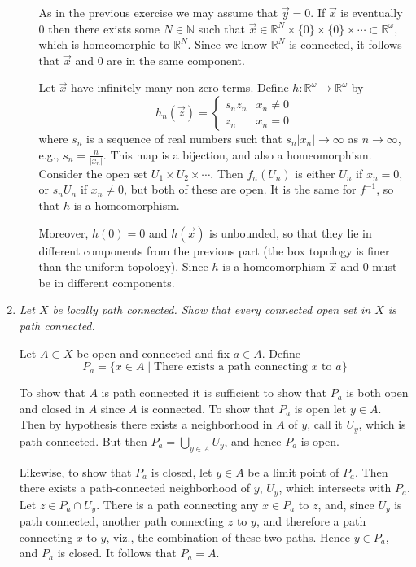 \documentclass[10pt]{article}
\newcommand{\N}{\mathbb{N}}
\newcommand{\R}{\mathbb{R}}
\begin{document}
\begin{enumerate}
\begin{enumerate}
As in the previous exercise we may assume that $\vec{y} = 0$.  If $\vec{x}$ is eventually $0$ then there exists some $N \in \N$ such that $\vec{x} \in \R^N \times \{0\} \times \{0\} \times \cdots \subset \R^\omega$, which is homeomorphic to $\R^N$.  Since we know $\R^N$ is connected, it follows that $\vec{x}$ and $0$ are in the same component.

Let $\vec{x}$ have infinitely many non-zero terms.  Define $h: \R^\omega \rightarrow \R^\omega$ by $$h_n(\vec{z}) = \begin{cases} s_n z_n & x_n \neq 0 \\ z_n & x_n = 0 \end{cases}$$ where $s_n$ is a sequence of real numbers such that $s_n|x_n| \rightarrow \infty$ as $n \rightarrow \infty$, e.g., $s_n = \frac{n}{|x_n|}$.  This map is a bijection, and also a homeomorphism.  Consider the open set $U_1 \times U_2 \times \cdots$.  Then $f_n(U_n)$ is either $U_n$ if $x_n = 0$, or $s_nU_n$ if $x_n \neq 0$, but both of these are open.  It is the same for $f^{-1}$, so that $h$ is a homeomorphism.

Moreover, $h(0) = 0$ and $h(\vec{x})$ is unbounded, so that they lie in different components from the previous part (the box topology is finer than the uniform topology).  Since $h$ is a homeomorphism $\vec{x}$ and $0$ must be in different components.

\end{enumerate}

\item \emph{Let $X$ be locally path connected.  Show that every connected open set in $X$ is path connected.}

Let $A \subset X$ be open and connected and fix $a \in A$.  Define $$P_a = \{x \in A \mid \mbox{There exists a path connecting $x$ to $a$}\}$$

To show that $A$ is path connected it is sufficient to show that $P_a$ is both open and closed in $A$ since $A$ is connected.  To show that $P_a$ is open let $y \in A$.  Then by hypothesis there exists a neighborhood in $A$ of $y$, call it $U_y$, which is path-connected.  But then $P_a = \bigcup_{y \in A} U_y$, and hence $P_a$ is open.

Likewise, to show that $P_a$ is closed, let $y \in A$ be a limit point of $P_a$.  Then there exists a path-connected neighborhood of $y$, $U_y$, which intersects with $P_a$.  Let $z \in P_a \cap U_y$.  There is a path connecting any $x \in P_a$ to $z$, and, since $U_y$ is path connected, another path connecting $z$ to $y$, and therefore a path connecting $x$ to $y$, viz., the combination of these two paths.  Hence $y \in P_a$, and $P_a$ is closed.  It follows that $P_a = A$.


\end{enumerate}
\end{document}
